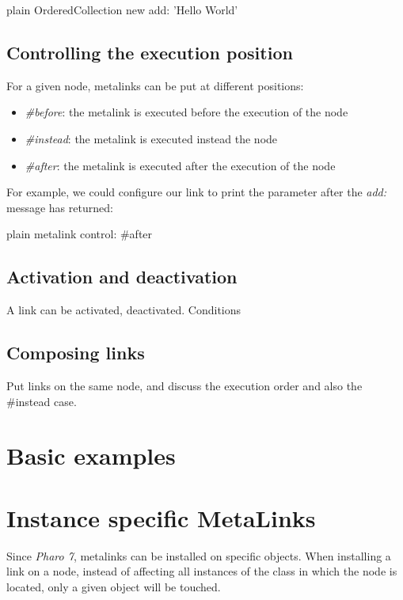 \documentclass[10pt,twoside,english]{_support/latex/sbabook/sbabook}
\begin{document}
\begin{displaycode}{plain}
OrderedCollection new add: 'Hello World'
\end{displaycode}
\subsection{Controlling the execution position}
For a given node, metalinks can be put at different positions:

\begin{itemize}
\item \textit{\#before}: the metalink is executed before the execution of the node
\item \textit{\#instead}: the metalink is executed instead the node
\item \textit{\#after}: the metalink is executed after the execution of the node
\end{itemize}

For example, we could configure our link to print the parameter after the \textit{add:} message has returned:

\begin{displaycode}{plain}
metalink control: #after
\end{displaycode}

\subsection{Activation and deactivation}
A link can be activated, deactivated.
Conditions
\subsection{Composing links}
Put links on the same node, and discuss the execution order and also the \#instead case.
\section{Basic examples}\section{Instance specific MetaLinks}
Since \textit{Pharo 7}, metalinks can be installed on specific objects.  When installing a link on a node, instead of affecting all instances of the class in which the node is located, only a given object will be touched.
\end{document}
